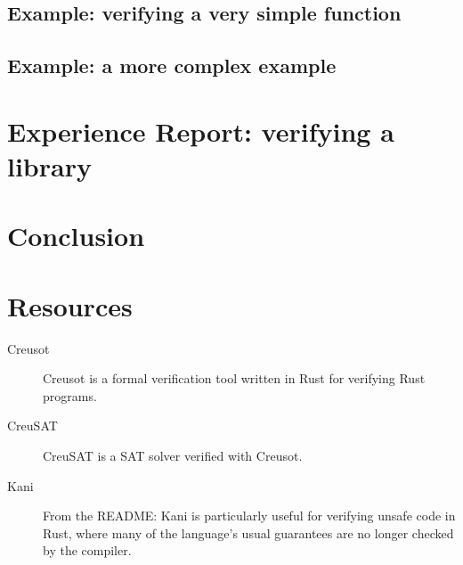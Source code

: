 \documentclass[12pt]{article}
\begin{document}
\subsection{Example: verifying a very simple function}

\subsection{Example: a more complex example}

\section{Experience Report: verifying a library} %

\section{Conclusion}


\section{Resources}

\begin{description}
  \item[Creusot] \cite{denisCreusot2023} \cite{denisCreusotFoundryDeductive2022}

    Creusot is a formal verification tool written in Rust for verifying Rust programs.
    
  \item[CreuSAT] \cite{skotamCreuSAT2023}

    CreuSAT is a SAT solver verified with Creusot.
    
  \item[Kani] \cite{Kani2023}

    From the README: Kani is particularly useful for verifying unsafe code in
    Rust, where many of the language's usual guarantees are no longer checked by
    the compiler.

\end{description}

\printbibliography
\end{document}
